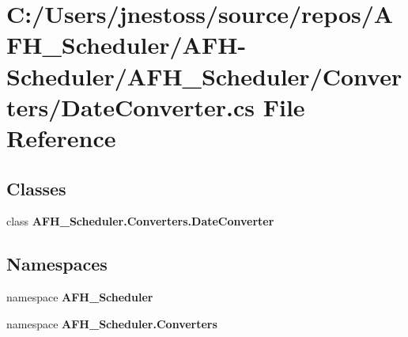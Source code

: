 \section{C\+:/\+Users/jnestoss/source/repos/\+A\+F\+H\+\_\+\+Scheduler/\+A\+F\+H-\/\+Scheduler/\+A\+F\+H\+\_\+\+Scheduler/\+Converters/\+Date\+Converter.cs File Reference}
\label{_date_converter_8cs}
\subsection*{Classes}
\begin{DoxyCompactItemize}
\item 
class \textbf{ A\+F\+H\+\_\+\+Scheduler.\+Converters.\+Date\+Converter}
\end{DoxyCompactItemize}
\subsection*{Namespaces}
\begin{DoxyCompactItemize}
\item 
namespace \textbf{ A\+F\+H\+\_\+\+Scheduler}
\item 
namespace \textbf{ A\+F\+H\+\_\+\+Scheduler.\+Converters}
\end{DoxyCompactItemize}
